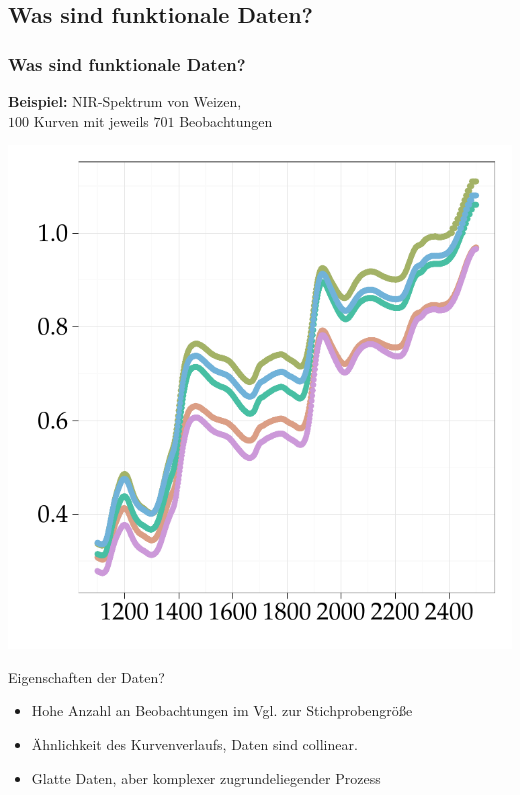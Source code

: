 \documentclass[xcolor=dvipsnames, compress, serif, professionalfont, handout]{beamer}
\newenvironment{knitrout}{}{} %
\renewenvironment{knitrout}{\begin{footnotesize}}{\end{footnotesize}}
\begin{document}
\subsection{Was sind funktionale Daten?}
\begin{frame}[fragile]
  \frametitle{Was sind funktionale Daten?}
  \textbf{Beispiel:} NIR-Spektrum von Weizen, \\ 
  $100$ Kurven mit jeweils $701$ Beobachtungen
  \hspace{-0.1cm}   
  \begin{minipage}{0.48\textwidth}
\begin{knitrout}
\color{fgcolor}

{\centering \includegraphics[width=\linewidth,height=\linewidth]{figure/graphics-GR_NIRspektrum} 

}


\end{knitrout}

  \end{minipage}
  \hspace{0.1cm}
  \begin{minipage}[c][][t]{0.48\textwidth}
    Eigenschaften der Daten?
    \begin{itemize}
      \item<1-> Hohe Anzahl an Beobachtungen im Vgl. zur Stichprobengr\"o{\ss}e
      \item<2-> \"Ahnlichkeit des Kurvenverlaufs, Daten sind collinear.
      \item<3-> Glatte Daten, aber komplexer zugrundeliegender Prozess
    \end{itemize}
    \hfill
  \end{minipage}
\end{frame}
\end{document}
